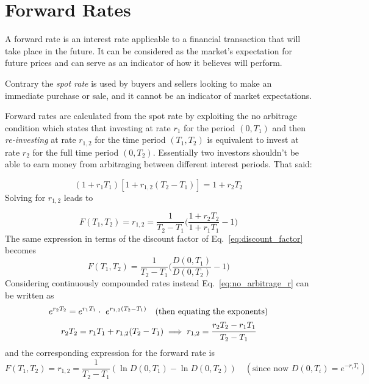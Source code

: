 \section{Forward Rates}
\label{calculating-forward-rates}
A forward rate is an interest rate applicable to a financial transaction that will take place in the future. It can be considered as the market's expectation for future prices and can serve as an indicator of how it believes will perform.

Contrary the \emph{spot rate} is used by buyers and sellers looking to make an immediate purchase or sale, and it cannot be an indicator of market expectations.

Forward rates are calculated from the spot rate by exploiting the no arbitrage condition which states that investing at rate $r_1$ for the period $(0, T_1)$ and then \emph{re-investing} at rate $r_{1,2}$ for the time period $(T_1, T_2)$ is equivalent to invest at rate $r_2$ for the full time period $(0, T_2)$. Essentially two investors shouldn't be able to earn money from arbitraging between different interest periods. That said:

\begin{equation}
(1+r_1 T_1)[1+r_{1,2}(T_2 - T_1)] = 1 + r_2 T_2
\label{eq:no_arbitrage_r}
\end{equation}
Solving for $r_{1,2}$ leads to

\begin{equation}
F(T_1, T_2) = r_{1,2} = \frac{1}{T_2 - T_1}\Big(\frac{1+r_2 T_2}{1+r_1 T_1} - 1 \Big)
\label{eq:forward_rate_simple}
\end{equation}
The same expression in terms of the discount factor of Eq.~\ref{eq:discount_factor} becomes
\begin{equation}
F(T_1, T_2) = \frac{1}{T_2 - T_1}\Big(\frac{D(0, T_1)}{D(0, T_2)} - 1 \Big)
\end{equation}
Considering continuously compounded rates instead Eq.~\ref{eq:no_arbitrage_r} can be written as
\begin{equation}
\begin{gathered}
e^{r_{2}T_{2}}=e^{r_{1}T_{1}}\cdot \ e^{r_{1,2} (T_{2}-T_{1})}\quad(\textrm{then equating the exponents})\\
r_{2}T_{2}=r_{1}T_{1}+r_{1,2}(T_{2}-T_{1})\implies r_{1,2} = \cfrac{r_2 T_2 - r_1 T_1}{T_2 - T_1} 
\end{gathered}
\end{equation}
and the corresponding expression for the forward rate is
\begin{equation}
F(T_1, T_2) = r_{1,2} = \frac {1}{T_{2}-T_{1}}(\ln D(0,T_{1})-\ln D(0,T_{2}))
\quad(\textrm{since now } D(0, T_i)=e^{-r_i T_i})
\label{eq:forward_rate_continous}
\end{equation}

